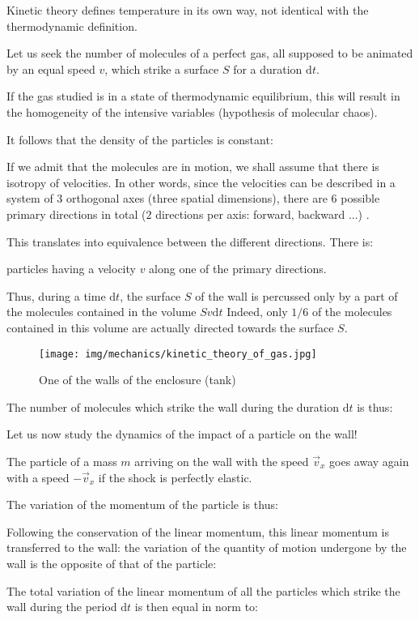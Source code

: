 	Kinetic theory defines temperature in its own way, not identical with the thermodynamic definition.
	
	Let us seek the number of molecules of a perfect gas, all supposed to be animated by an equal speed $v$, which strike a surface $S$ for a duration $\mathrm{d}t$.

	If the gas studied is in a state of thermodynamic equilibrium, this will result in the homogeneity of the intensive variables (hypothesis of molecular chaos).

	It follows that the density of the particles is constant:
	
	If we admit that the molecules are in motion, we shall assume that there is isotropy of velocities. In other words, since the velocities can be described in a system of $3$ orthogonal axes (three spatial dimensions), there are $6$ possible primary directions in total ($2$ directions per axis: forward, backward ...) .

	This translates into equivalence between the different directions. There is:
	
	particles having a velocity $v$ along one of the primary directions.

	Thus, during a time $\mathrm{d}t$, the surface $S$ of the wall is percussed only by a part of the molecules contained in the volume $Sv\mathrm{d}t$ Indeed, only $1/6$ of the molecules contained in this volume are actually directed towards the surface $S$.
	\begin{figure}[H]
		\centering
		\texttt{[image: img/mechanics/kinetic\_theory\_of\_gas.jpg]}
		\caption[]{One of the walls of the enclosure (tank)}
	\end{figure}
	The number of molecules which strike the wall during the duration $\mathrm{d}t$ is thus:
	
	Let us now study the dynamics of the impact of a particle on the wall!

	The particle of a mass $m$ arriving on the wall with the speed $\vec{v}_x$ goes away again with a speed $-\vec{v}_x$ if the shock is perfectly elastic.

	The variation of the momentum of the particle is thus:
	
	
	Following the conservation of the linear momentum, this linear momentum is transferred to the wall: the variation of the quantity of motion undergone by the wall is the opposite of that of the particle:
	
	The total variation of the linear momentum of all the particles which strike the wall during the period $\mathrm{d}t$ is then equal in norm to:
	

